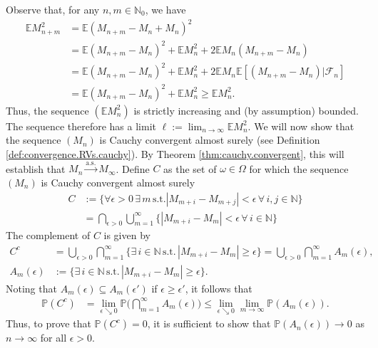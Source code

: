 \documentclass[12pt]{book}
\let\varepsilon\epsilon
\numberwithin{equation}{chapter}
\theoremstyle{plain}
\numberwithin{theorem}{section}
\theoremstyle{definition}
\numberwithin{exercise}{chapter}
\let\oldendproof\endproof
\renewenvironment{proof}[1][\proofname]{%
  \oldproof[\scshape\underline{#1}]%
}{\oldendproof}
\newcommand{\<}{\langle}
\renewcommand{\>}{\rangle}
\renewcommand{\(}{\left(}
\renewcommand{\)}{\right)}
\renewcommand{\[}{\left[}
\renewcommand{\]}{\right]}
\newcommand\Eb{\mathds{E}}
\newcommand\Pb{\mathds{P}}
\newcommand\Nb{\mathds{N}}
\newcommand\Fc{\mathscr{F}}
\newcommand\eps{\varepsilon}
\newcommand\om{\omega}
\newcommand\Om{\Omega}
\begin{document}
\begin{proof}
Observe that, for any $n,m \in \Nb_0$, we have
\begin{align}
\Eb M_{n+m}^2
	&=	\Eb ( M_{n+m} - M_n + M_n )^2 \\
	&=		\Eb ( M_{n+m} - M_n)^2  + \Eb M_n^2 + 2 \Eb M_n ( M_{n+m} - M_n) \\
	&=	\Eb ( M_{n+m} - M_n)^2  + \Eb M_n^2 + 2 \Eb M_n \Eb[ ( M_{n+m} - M_n) | \Fc_n ] \\
	&=		\Eb ( M_{n+m} - M_n)^2  + \Eb M_n^2
	\geq  \Eb M_n^2 .
\end{align}
Thus, the sequence $(\Eb M_n^2)$ is strictly increasing and (by assumption) bounded.  The sequence therefore has a limit $\ell := \lim_{n \to \infty} \Eb M_n^2$.
We will now show that the sequence $(M_n)$ is Cauchy convergent almost surely (see Definition \ref{def:convergence.RVs.cauchy}).  By Theorem \ref{thm:cauchy.convergent}, this will establish that $M_n \stackrel{\text{a.s.}}{\to} M_\infty$.  Define $C$ as the set of $\om \in \Om$ for which the sequence $(M_n)$ is Cauchy convergent almost surely
\begin{align}
C
	&:= \{ \forall \eps > 0 \, \exists \, m \, \text{s.t.} |M_{m+i} - M_{m+j} | < \eps \, \forall \, i,j \in \Nb \} \\
	&=	\bigcap_{\eps > 0} \bigcup_{m=1}^\infty \{ |M_{m+i} - M_m | < \eps \, \forall \, i \in \Nb \}
\end{align}
The complement of $C$ is given by
\begin{align}
C^c
	&=	\bigcup_{\eps > 0} \bigcap_{m=1}^\infty \{ \exists \, i \in \Nb \, \text{s.t.} \, |M_{m+i} - M_m | \geq \eps \} 
	= 	\bigcup_{\eps > 0} \bigcap_{m=1}^\infty A_m(\eps) , \\
A_m(\eps)
	&:=	\{ \exists \, i \in \Nb \, \text{s.t.} \, |M_{m+i} - M_m | \geq \eps \} .
\end{align}
Noting that $A_m(\eps) \subseteq A_m(\eps')$ if $\eps \geq \eps'$, it follows  that
\begin{align}
\Pb(C^c)
	&=	\lim_{\eps \searrow 0} \Pb \Big( \bigcap_{m=1}^\infty A_m(\eps) \Big)
	\leq	\lim_{\eps \searrow 0} \lim_{m \to \infty} \Pb( A_m(\eps) ) .
\end{align}
Thus, to prove that $\Pb(C^c)=0$, it is sufficient to show that $\Pb(A_n(\eps)) \to 0$ as $n \to \infty$ for all $\eps > 0$.  

\end{proof}
\end{document}
